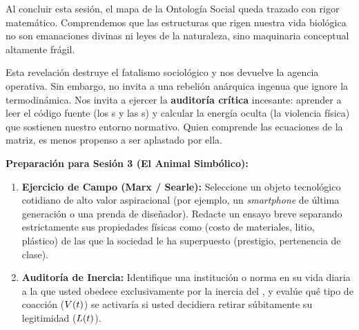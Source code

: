Al concluir esta sesión, el mapa de la Ontología Social queda trazado con rigor matemático. Comprendemos que las estructuras que rigen nuestra vida biológica no son emanaciones divinas ni leyes de la naturaleza, sino maquinaria conceptual altamente frágil. 

Esta revelación destruye el fatalismo sociológico y nos devuelve la agencia operativa. Sin embargo, no invita a una rebelión anárquica ingenua que ignore la termodinámica. Nos invita a ejercer la \textbf{auditoría crítica} incesante: aprender a leer el código fuente (los \ActoDeclarativo{}s y las \ReglaConstitutiva{}s) y calcular la energía oculta (la violencia física) que sostienen nuestro entorno normativo. Quien comprende las ecuaciones de la matriz, es menos propenso a ser aplastado por ella.

\begin{actividad}
\textbf{Preparación para Sesión 3 (El Animal Simbólico):}
\begin{enumerate}
    \item \textbf{Ejercicio de Campo (Marx / Searle):} Seleccione un objeto tecnológico cotidiano de alto valor aspiracional (por ejemplo, un \textit{smartphone} de última generación o una prenda de diseñador). Redacte un ensayo breve separando estrictamente sus propiedades físicas como \HechoBruto{} (costo de materiales, litio, plástico) de las \FuncionEstatus{} que la sociedad le ha superpuesto (prestigio, pertenencia de clase).
    \item \textbf{Auditoría de Inercia:} Identifique una institución o norma en su vida diaria a la que usted obedece exclusivamente por la inercia del \Habitus, y evalúe qué tipo de coacción ($V(t)$) se activaría si usted decidiera retirar súbitamente su legitimidad ($L(t)$).
\end{enumerate}
\end{actividad}